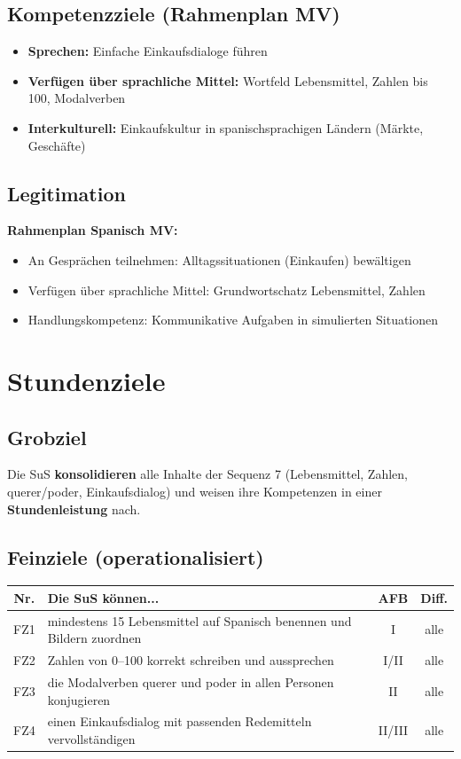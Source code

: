 \documentclass[11pt,a4paper]{article}
\begin{document}
\subsection{Kompetenzziele (Rahmenplan MV)}
\begin{itemize}
    \item \textbf{Sprechen:} Einfache Einkaufsdialoge führen
    \item \textbf{Verfügen über sprachliche Mittel:} Wortfeld Lebensmittel, Zahlen bis 100, Modalverben
    \item \textbf{Interkulturell:} Einkaufskultur in spanischsprachigen Ländern (Märkte, Geschäfte)
\end{itemize}

\subsection{Legitimation}
\textbf{Rahmenplan Spanisch MV:}
\begin{itemize}
    \item An Gesprächen teilnehmen: Alltagssituationen (Einkaufen) bewältigen
    \item Verfügen über sprachliche Mittel: Grundwortschatz Lebensmittel, Zahlen
    \item Handlungskompetenz: Kommunikative Aufgaben in simulierten Situationen
\end{itemize}

\section{Stundenziele}

\subsection{Grobziel}
Die SuS \textbf{konsolidieren} alle Inhalte der Sequenz 7 (Lebensmittel, Zahlen, querer/poder, Einkaufsdialog) und weisen ihre Kompetenzen in einer \textbf{Stundenleistung} nach.

\subsection{Feinziele (operationalisiert)}
\begin{tabular}{|c|p{8cm}|c|c|}
\hline
\textbf{Nr.} & \textbf{Die SuS können...} & \textbf{AFB} & \textbf{Diff.} \\
\hline
FZ1 & mindestens 15 Lebensmittel auf Spanisch benennen und Bildern zuordnen & I & alle \\
\hline
FZ2 & Zahlen von 0--100 korrekt schreiben und aussprechen & I/II & alle \\
\hline
FZ3 & die Modalverben querer und poder in allen Personen konjugieren & II & alle \\
\hline
FZ4 & einen Einkaufsdialog mit passenden Redemitteln vervollständigen & II/III & alle \\
\hline
\end{tabular}
\end{document}
